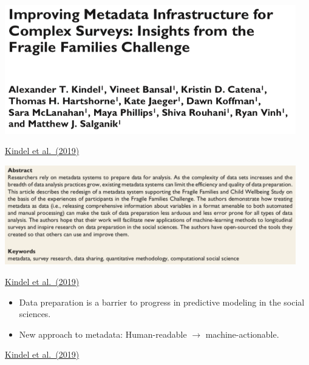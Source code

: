 \documentclass[aspectratio=169]{beamer}
\begin{document}
\begin{frame}

\begin{center}
\includegraphics[width=0.95\textwidth]{figures/kindel_improving_2019_title}
\end{center}

\vfill
\href{https://doi.org/10.1177/2378023118817378}{Kindel et al.\ (2019)}
\end{frame}
\begin{frame}

\begin{center}
\includegraphics[width=0.95\textwidth]{figures/kindel_improving_2019_abs}
\end{center}

\vfill
\href{https://doi.org/10.1177/2378023118817378}{Kindel et al.\ (2019)}
\end{frame}
\begin{frame}

\begin{itemize}
\item Data preparation is a barrier to progress in predictive modeling in the social sciences.
\pause
\item New approach to metadata: Human-readable $\rightarrow$ machine-actionable.
\end{itemize}

\vfill
\href{https://doi.org/10.1177/2378023118817378}{Kindel et al.\ (2019)}

\end{frame}
\end{document}
